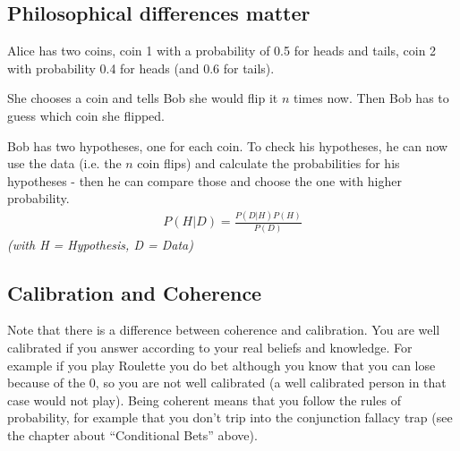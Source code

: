\documentclass[../main/Notes.tex]{subfiles}
\begin{document}
\subsection*{Philosophical differences matter}
Alice has two coins, coin 1 with a probability of 0.5 for heads and tails, coin 2 with probability 0.4 for heads (and 0.6 for tails). 

She chooses a coin and tells Bob she would flip it $n$ times now. Then Bob has to guess which coin she flipped.

Bob has two hypotheses, one for each coin. To check his hypotheses, he can now use the data (i.e. the $n$ coin flips) and calculate the probabilities for his hypotheses - then he can compare those and choose the one with higher probability.
\begin{align*}
P(H|D) = \frac{P(D|H)P(H)}{P(D)}
\end{align*}
\textit{(with H = Hypothesis, D = Data)}

\subsection*{Calibration and Coherence}
Note that there is a difference between coherence and calibration.
You are well calibrated if you answer according to your real beliefs and knowledge. For example if you play Roulette you do bet although you know that you can lose because of the 0, so you are not well calibrated (a well calibrated person in that case would not play). 
Being coherent means that you follow the rules of probability, for example that you don't trip into the conjunction fallacy trap (see the chapter about ``Conditional Bets'' above).
\end{document}
